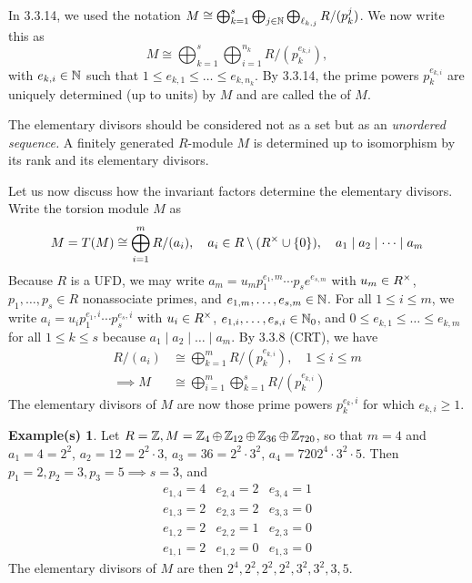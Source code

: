 \documentclass[11pt]{book}
\theoremstyle{definition}   \newtheorem{defn}[counter]{Definition} %
\newtheorem*{example*}{Example(s)}   \newtheorem*{warning}{Warning}
\newcommand{\bs}{\setminus}   \newcommand{\A}{\mathcal{A}}   \newcommand{\sy}{\textnormal{Syl}}   \newcommand{\size}[1]{\left| #1 \right|}
\newcommand{\vs}{\vspace{8pt}}
\numberwithin{counter}{chapter}
\begin{document}
\vs

In 3.3.14, we used the notation $M \cong \bigoplus_{k=1}^s \bigoplus_{j \in \operatorname{\mathbb{N}}} \bigoplus_{\ell_{k,j}} R/(p_k^j)$. We now write this as
	\[M \cong \bigoplus_{k=1}^s \bigoplus_{i=1}^{n_k} R/(p_k^{e_{k,i}}), \]
with $e_{k,i} \in \operatorname{\mathbb{N}}$ such that $1 \leq e_{k,1} \leq \dots \leq e_{k,n_k}$. By 3.3.14, the prime powers $p_k^{e_{k,i}}$ are uniquely determined (up to units) by $M$ and are called the  of $M$.

\vs

\begin{remark}[+ Discussion]
The elementary divisors should be considered not as a set but as an \emph{unordered sequence.} A finitely generated $R$-module $M$ is determined up to isomorphism by its rank and its elementary divisors.

Let us now discuss how the invariant factors determine the elementary divisors. Write the torsion module $M$ as
	\[M = T(M) \cong \bigoplus_{i=1}^m R/(a_i), \quad a_i \in R\bs(R\x \cup \{0\}), \quad a_1 \mid a_2 \mid \dots \mid a_m \]
Because $R$ is a UFD, we may write $a_m = u_m p_1^{e_1,m} \cdots p_s e^{e_{s,m}}$ with $u_m \in R^{\times}$, $p_1,\dots,p_s \in R$ nonassociate primes, and $e_{1,m},\dots,e_{s,m} \in \operatorname{\mathbb{N}}$. For all $1 \leq i \leq m$, we write $a_i = u_i p_1 ^{e_1,i} \cdots p_s ^{e_s,i}$ with $u_i \in R^{\times}$, $e_{1,i},\dots,e_{s,i} \in \operatorname{\mathbb{N}}_0$, and $0 \leq e_{k,1} \leq \dots \leq e_{k,m}$ for all $1 \leq k \leq s$ because $a_1 \mid a_2 \mid \dots \mid a_m$. By 3.3.8 (CRT), we have
\begin{align*}
R/(a_i) &\cong \bigoplus_{k=1}^m R/(p_k^{e_{k,i}}), \quad 1 \leq i \leq m \\
\implies M &\cong \bigoplus_{i=1}^m \bigoplus_{k=1}^s R/(p_k^{e_{k,i}})
\end{align*}
The elementary divisors of $M$ are now those prime powers $p_k^{e_k,i}$ for which $e_{k,i} \geq 1$.

\vs

\begin{example*}
Let $R = \operatorname{\mathbb{Z}}, M = \operatorname{\mathbb{Z}}_4 \oplus \operatorname{\mathbb{Z}}_{12} \oplus \operatorname{\mathbb{Z}}_{36} \oplus \operatorname{\mathbb{Z}}_{720}$, so that $m = 4$ and $a_1 = 4 = 2^2$, $a_2 = 12 = 2^2 \cdot 3$, $a_3 = 36 = 2^2 \cdot 3^2$, $a_4 = 720 2^4 \cdot 3^2 \cdot 5$. Then $p_1 = 2, p_2 = 3, p_3 = 5 \implies s=3$, and
\[\begin{array}{rrr}
e_{1,4} = 4 & e_{2,4} = 2 & e_{3,4} = 1 \\
e_{1,3} = 2 & e_{2,3} = 2 & e_{3,3} = 0 \\
e_{1,2} = 2 & e_{2,2} = 1 & e_{2,3} = 0 \\
e_{1,1} = 2 & e_{1,2} = 0 & e_{1,3} = 0
\end{array} \]
The elementary divisors of $M$ are then $2^4,2^2,2^2,2^2,3^2,3^2,3,5$.
\end{example*}


\end{remark}
\end{document}
